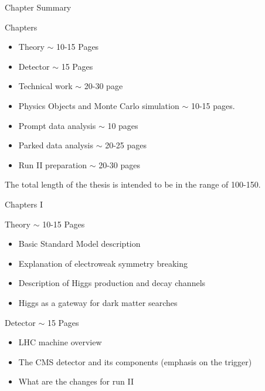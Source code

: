 \documentclass[8pt]{beamer}
\begin{document}
\begin{frame}{Chapter Summary}

\begin{block}{Chapters}

\begin{itemize}
  \item Theory $\sim$ 10-15 Pages
  \item Detector $\sim$ 15 Pages
  \item Technical work $\sim$ 20-30 page
  \item Physics Objects and Monte Carlo simulation $\sim$ 10-15 pages.
  \item Prompt data analysis $\sim$ 10 pages
  \item Parked data analysis $\sim$ 20-25 pages
  \item Run II preparation $\sim$ 20-30 pages
\end{itemize}

\end{block}

\begin{center}
The total length of the thesis is intended to be in the range of 100-150.
\end{center}

\end{frame}


\begin{frame}{Chapters I}

\begin{block}{Theory $\sim$ 10-15 Pages}

\begin{itemize}
  \item Basic Standard Model description
  \item Explanation of electroweak symmetry breaking
  \item Description of Higgs production and decay channels
  \item Higgs as a gateway for dark matter searches
\end{itemize}

\end{block}

\begin{block}{Detector $\sim$ 15 Pages}

\begin{itemize}
  \item LHC machine overview
  \item The CMS detector and its components (emphasis on the trigger)
  \item What are the changes for run II 
\end{itemize}

\end{block}

\end{frame}
\end{document}
